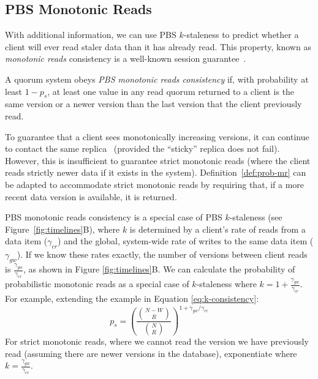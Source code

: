 \documentclass{vldb}
\newcommand{\subsectionskip}{-0em}
\begin{document}
\vspace{\subsectionskip}\subsection{PBS Monotonic Reads}

With additional information, we can use PBS $k$-staleness to predict
whether a client will ever read staler data than it has already read.
This property, known as \textit{monotonic reads} consistency is a
well-known session guarantee~\cite{sessionguarantees}.

\begin{definition}
\label{def:prob-mr}
A quorum system obeys \textit{PBS monotonic reads consistency} if,
with probability at least $1-p_{s}$, at least one value in any
read quorum returned to a client is the same version or a newer
version than the last version that the client previously read.
\end{definition}

To guarantee that a client sees monotonically increasing versions, it
can continue to contact the same replica~\cite{vogels-defs} (provided
the ``sticky'' replica does not fail).  However, this is insufficient to
guarantee strict monotonic reads (where the client reads strictly
newer data if it exists in the system).  Definition~\ref{def:prob-mr}
can be adapted to accommodate strict monotonic reads by requiring
that, if a more recent data version is available, it is returned.

PBS monotonic reads consistency is a special case of PBS $k$-staleness (see
Figure~\ref{fig:timelines}B), where $k$ is determined by a client's
rate of reads from a data item ($\gamma_{cr}$) and the global,
system-wide rate of writes to the same data item ($\gamma_{gw}$).  If
we know these rates exactly, the number of versions between client
reads is $\frac{\gamma_{gw}}{\gamma_{cr}}$, as shown in Figure
\ref{fig:timelines}B.  We can calculate the probability of
probabilistic monotonic reads as a special case of $k$-staleness where
$k=1+\frac{\gamma_{gw}}{\gamma_{cr}}$.  For example, extending the
example in Equation \ref{eq:k-consistency}:
\begin{equation}
\label{eq:prob-mr}
p_{s} = \left(\frac{{N-W \choose R}}{{N \choose R}}\right)^{1+\gamma_{gw}/\gamma_{cr}}
\end{equation}
For strict monotonic reads, where we cannot read the version we have
previously read (assuming there are newer versions in the database),
exponentiate where $k=\frac{\gamma_{gw}}{\gamma_{cr}}$.
\end{document}
